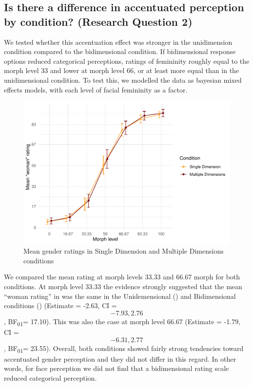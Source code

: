\documentclass[
  man]{apa7}
\begin{document}
\hypertarget{is-there-a-difference-in-accentuated-perception-by-condition-research-question-2}{%
\subsection{Is there a difference in accentuated perception by condition? (Research Question 2)}\label{is-there-a-difference-in-accentuated-perception-by-condition-research-question-2}}

We tested whether this accentuation effect was stronger in the unidimension condition compared to the bidimensional condition. If bidimensional response options reduced categorical perceptions, ratings of femininity roughly equal to the morph level 33 and lower at morph level 66, or at least more equal than in the unidimensional condition. To test this, we modelled the data as bayesian mixed effects models, with each level of facial femininity as a factor.

\begin{figure}
\centering
\includegraphics{RO_revisions_doc_files/figure-latex/exp-two-inf-1.pdf}
\caption{\label{fig:exp-two-inf}Mean gender ratings in Single Dimension and Multiple Dimensions conditions}
\end{figure}

We compared the mean rating at morph levels 33.33 and 66.67 morph for both conditions. At morph level 33.33 the evidence strongly suggested that the mean ``woman rating'' in was the same in the Unidemensional () and Bidimensional conditions () (Estimate = -2.63, CI =\[-7.93, 2.76\], BF\textsubscript{01}= 17.10). This was also the case at morph level 66.67 (Estimate = -1.79, CI =\[-6.31, 2.77\], BF\textsubscript{01}= 23.55). Overall, both conditions showed fairly strong tendencies toward accentuated gender perception and they did not differ in this regard. In other words, for face perception we did not find that a bidimensional rating scale reduced categorical perception.
\end{document}
